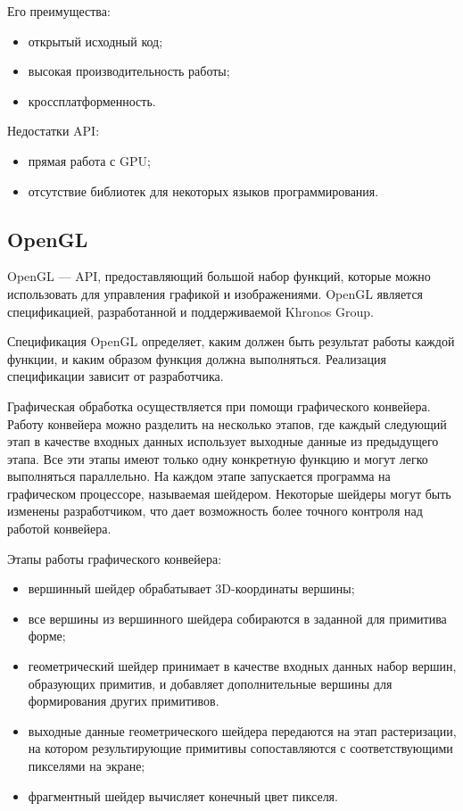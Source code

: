 Его преимущества:

\begin{itemize}
	\item открытый исходный код;
	\item высокая производительность работы;
	\item кроссплатформенность.
\end{itemize}

Недостатки API:

\begin{itemize}
	\item прямая работа с GPU;
	\item отсутствие библиотек для некоторых языков программирования.
\end{itemize}

\subsection{OpenGL}

OpenGL --- API, предоставляющий большой набор функций, которые можно использовать для управления графикой и изображениями. OpenGL является спецификацией, разработанной и поддерживаемой Khronos Group.

Спецификация OpenGL определяет, каким должен быть результат работы каждой функции, и каким образом функция должна выполняться. Реализация спецификации зависит от разработчика.

Графическая обработка осуществляется при помощи графического конвейера. Работу конвейера можно разделить на несколько этапов, где каждый следующий этап в качестве входных данных использует выходные данные из предыдущего этапа. Все эти этапы имеют только одну конкретную функцию и могут легко выполняться параллельно. На каждом этапе запускается программа на графическом процессоре, называемая шейдером. Некоторые шейдеры могут быть изменены разработчиком, что дает возможность более точного контроля над работой конвейера.

Этапы работы графического конвейера:

\begin{itemize}
	\item вершинный шейдер обрабатывает 3D-координаты вершины;
	\item все вершины из вершинного шейдера собираются в заданной для примитива форме;
	\item геометрический шейдер принимает в качестве входных данных набор вершин, образующих примитив, и добавляет дополнительные вершины для формирования других примитивов.
	\item выходные данные геометрического шейдера передаются на этап растеризации, на котором результирующие примитивы сопоставляются с соответствующими пикселями на экране;
	\item фрагментный шейдер вычисляет конечный цвет пикселя.
\end{itemize}

